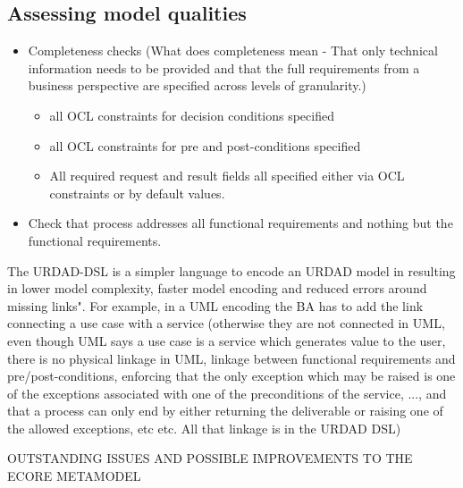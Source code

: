 
\subsection{Assessing model qualities}



\begin{itemize}
  \item Completeness checks
(What does completeness mean - That only technical information needs to be provided and that the full requirements
from a business perspective are specified across levels of granularity.)
    \begin{itemize}
     \item all OCL constraints for decision conditions specified
     \item all OCL constraints for pre and post-conditions specified
     \item All required request and result fields all specified either via OCL constraints 
	or by default values.
    \end{itemize}
  \item Check that process addresses all functional requirements and nothing but the functional requirements.
\end{itemize}





The URDAD-DSL is a simpler language to encode an URDAD model in resulting in lower model complexity, faster model encoding and reduced errors around missing links". For example, in a UML encoding the BA has to add the link connecting a use case with a service (otherwise they are not connected in UML, even though UML says a use case is a service which generates value to the user, there is no physical linkage in UML, linkage between functional requirements and pre/post-conditions, enforcing that the only exception which may be raised is one of the exceptions associated with one of the preconditions of the service, ..., and that a process can only end by either returning the deliverable or raising one of the allowed exceptions, etc etc. All that linkage is in the URDAD DSL)
			
		
	\item OUTSTANDING ISSUES AND POSSIBLE IMPROVEMENTS TO THE ECORE METAMODEL
